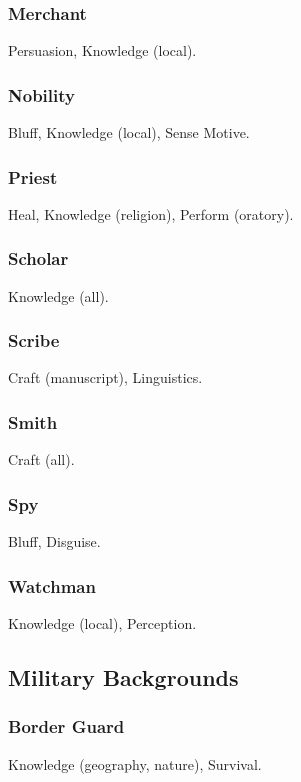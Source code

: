\subsubsection{Merchant}
 Persuasion, Knowledge (local).

\subsubsection{Nobility}
 Bluff, Knowledge (local), Sense Motive.

\subsubsection{Priest}
 Heal, Knowledge (religion), Perform (oratory).

\subsubsection{Scholar}
 Knowledge (all).

\subsubsection{Scribe}
 Craft (manuscript), Linguistics.

\subsubsection{Smith}
 Craft (all).

\subsubsection{Spy}
 Bluff, Disguise.

\subsubsection{Watchman}
 Knowledge (local), Perception.

\subsection{Military Backgrounds}

\subsubsection{Border Guard}
 Knowledge (geography, nature), Survival.

